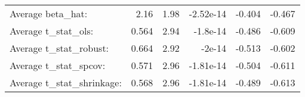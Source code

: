 \begin{tabular}{lrrrrr}
\hline
                           &       &      &           &        &        \\
\hline
 Average beta\_hat:         & 2.16  & 1.98 & -2.52e-14 & -0.404 & -0.467 \\
 Average t\_stat\_ols:       & 0.564 & 2.94 & -1.8e-14  & -0.486 & -0.609 \\
 Average t\_stat\_robust:    & 0.664 & 2.92 & -2e-14    & -0.513 & -0.602 \\
 Average t\_stat\_spcov:     & 0.571 & 2.96 & -1.81e-14 & -0.504 & -0.611 \\
 Average t\_stat\_shrinkage: & 0.568 & 2.96 & -1.81e-14 & -0.489 & -0.613 \\
\hline
\end{tabular}